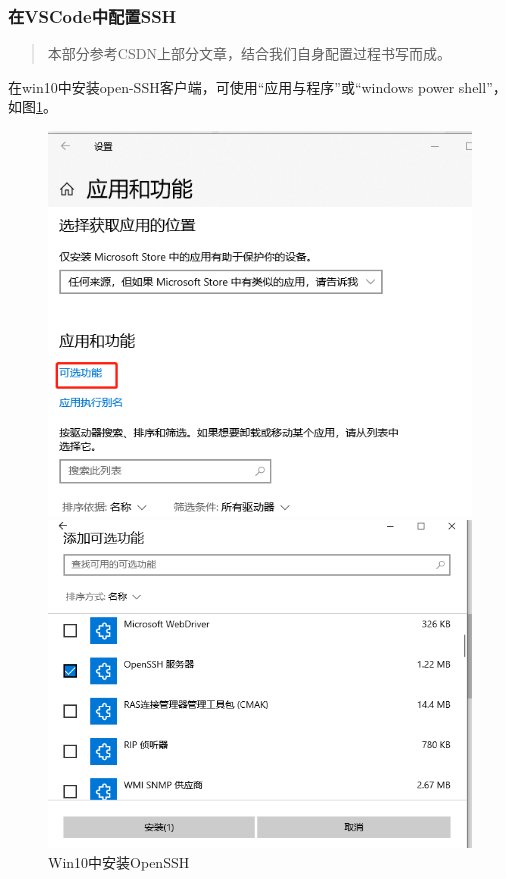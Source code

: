 \subsubsection{在VSCode中配置SSH}
\begin{quotation}
    本部分参考CSDN上部分文章\cite{ssh}，结合我们自身配置过程书写而成。
\end{quotation}
在win10中安装open-SSH客户端，可使用“应用与程序”或“windows power shell”，如图\ref{win-ssh}。
\begin{figure}[ht]
    \centering
    \begin{minipage}[c]{0.45\textwidth}
        \includegraphics[width=\textwidth]{image/env/win-ssh.png}
    \end{minipage}
    \begin{minipage}[c]{0.45\textwidth}
        \includegraphics[width=\textwidth]{image/env/win-ssh2.png}
    \end{minipage}

    \caption{Win10中安装OpenSSH}
    \label{win-ssh}
\end{figure}

